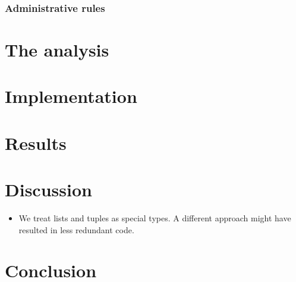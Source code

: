 \documentclass[a4paper]{scrartcl}
\begin{document}
\subsubsection{Administrative rules}

\section{The analysis}

\section{Implementation}
\section{Results}
\section{Discussion}
\begin{itemize}
\item
    We treat lists and tuples as special types. A different approach might
    have resulted in less redundant code.
\end{itemize}

\section{Conclusion}
\end{document}
